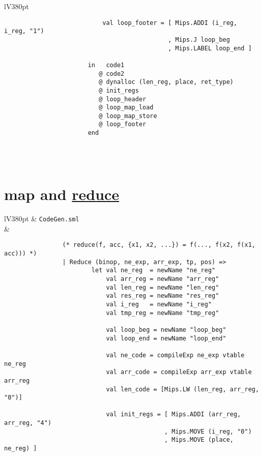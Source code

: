 \documentclass[a4paper]{article}
\begin{document}
\begin{appendices}
\begin{center}
\begin{tabular}{lV{380pt}}
\begin{verbatim}
				           val loop_footer = [ Mips.ADDI (i_reg, i_reg, "1")
				                             , Mips.J loop_beg
				                             , Mips.LABEL loop_end ]
				
				       in   code1                                        
				          @ code2                                        
				          @ dynalloc (len_reg, place, ret_type)          
				          @ init_regs                                    
				          @ loop_header                                  
				          @ loop_map_load                                
				          @ loop_map_store                               
				          @ loop_footer                                  
				       end
			\end{verbatim}
			\\
			\bottomrule \\
		\end{tabular}
	\end{center}
	
	\section{map and \underline{reduce}} \label{app:CodeGenReduce}
	\begin{center}	
		\begin{tabular}{lV{380pt}}
			\toprule
			& \verb|CodeGen.sml|\\
			\midrule
			&
			\begin{verbatim}		
				(* reduce(f, acc, {x1, x2, ...}) = f(..., f(x2, f(x1, acc))) *)
				| Reduce (binop, ne_exp, arr_exp, tp, pos) => 
				        let val ne_reg  = newName "ne_reg"
				            val arr_reg = newName "arr_reg"
				            val len_reg = newName "len_reg"
				            val res_reg = newName "res_reg"
				            val i_reg   = newName "i_reg"
				            val tmp_reg = newName "tmp_reg"
				
				            val loop_beg = newName "loop_beg"
				            val loop_end = newName "loop_end"
				
				            val ne_code = compileExp ne_exp vtable ne_reg
				            val arr_code = compileExp arr_exp vtable arr_reg
				            val len_code = [Mips.LW (len_reg, arr_reg, "0")]
				
				            val init_regs = [ Mips.ADDI (arr_reg, arr_reg, "4")
				                            , Mips.MOVE (i_reg, "0")
				                            , Mips.MOVE (place, ne_reg) ]
				

\end{verbatim}
\end{tabular}
\end{center}
\end{appendices}
\end{document}
